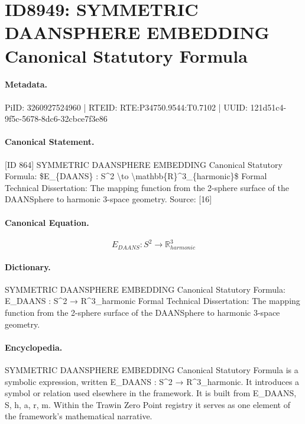 \section*{ID8949: SYMMETRIC DAANSPHERE EMBEDDING Canonical Statutory Formula}
\paragraph{Metadata.}
PiID: 3260927524960 | RTEID: RTE:P34750.9544:T0.7102 | UUID: 121d51c4-9f5c-5678-8dc6-32cbce7f3e86

\paragraph{Canonical Statement.}
[ID 864] SYMMETRIC DAANSPHERE EMBEDDING Canonical Statutory Formula: \$E\_\{DAANS\} : S\textasciicircum{}2 \textbackslash{}to \textbackslash{}mathbb\{R\}\textasciicircum{}3\_\{harmonic\}\$ Formal Technical Dissertation: The mapping function from the 2-sphere surface of the DAANSphere to harmonic 3-space geometry. Source: [16]

\paragraph{Canonical Equation.}
\[
E_{DAANS} : S^2 \to \mathbb{R}^3_{harmonic}
\]

\paragraph{Dictionary.}
SYMMETRIC DAANSPHERE EMBEDDING Canonical Statutory Formula: E\_DAANS : S\textasciicircum{}2 → R\textasciicircum{}3\_harmonic Formal Technical Dissertation: The mapping function from the 2-sphere surface of the DAANSphere to harmonic 3-space geometry.

\paragraph{Encyclopedia.}
SYMMETRIC DAANSPHERE EMBEDDING Canonical Statutory Formula is a symbolic expression, written E\_DAANS : S\textasciicircum{}2 → R\textasciicircum{}3\_harmonic. It introduces a symbol or relation used elsewhere in the framework. It is built from E\_DAANS, S, h, a, r, m. Within the Trawin Zero Point registry it serves as one element of the framework's mathematical narrative.

